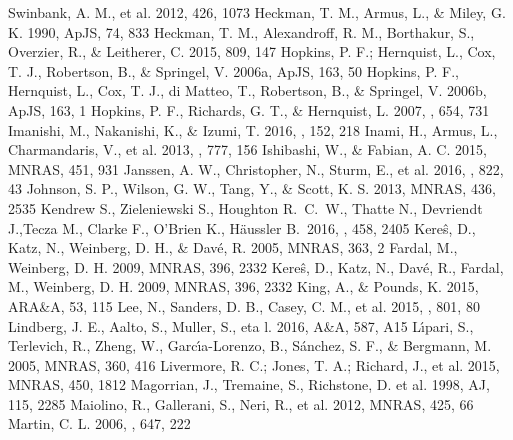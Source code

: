 \documentclass{pasa}%
\begin{document}
\begin{thebibliography}{}
    Swinbank, A. M., et al. 2012, 426, 1073
   Heckman, T. M., Armus, L., \& Miley,
    G. K. 1990, ApJS, 74, 833
   Heckman, T. M., Alexandroff, R. M.,
    Borthakur, S., Overzier, R., \& Leitherer, C. 2015, 809, 147
   Hopkins, P. F.; Hernquist, L., Cox,
    T. J., Robertson, B., \& Springel, V. 2006a, ApJS, 163, 50
   Hopkins, P. F., Hernquist, L., Cox,
    T. J., di Matteo, T., Robertson, B., \& Springel, V. 2006b, ApJS, 163, 1
   Hopkins, P. F., Richards, G. T.,
    \& Hernquist, L. 2007, \apj, 654, 731
   Imanishi, M., Nakanishi, K., \&
    Izumi, T. 2016, \aj, 152, 218
   Inami, H., Armus, L., Charmandaris, V.,
    et al. 2013, \apj, 777, 156
   Ishibashi, W., \& Fabian,
    A. C. 2015, MNRAS, 451, 931
   Janssen, A. W., Christopher, N.,
    Sturm, E., et al. 2016, \apj, 822, 43
   Johnson, S. P., Wilson, G. W., Tang,
    Y., \& Scott, K. S. 2013, MNRAS, 436, 2535
   Kendrew S., Zieleniewski S., Houghton
    R.~C.~W., Thatte N., Devriendt J.,Tecza M., Clarke F., O'Brien K.,
    H{\"a}ussler B.\ 2016, \mnras, 458, 2405
   Kere\^s, D., Katz, N., Weinberg,
    D. H., \& Dav\'e, R. 2005, MNRAS, 363, 2
    Fardal, M., Weinberg, D. H. 2009, MNRAS, 396, 2332
   Kere\^s, D., Katz, N., Dav\'e, R.,
    Fardal, M., Weinberg, D. H. 2009, MNRAS, 396, 2332
   King, A., \& Pounds, K. 2015, ARA\&A,
    53, 115
   Lee, N., Sanders, D. B., Casey, C. M., et
    al. 2015, \apj, 801, 80
   Lindberg, J. E., Aalto, S., Muller,
    S., eta l. 2016, A\&A, 587, A15
   L\'{\i}pari, S., Terlevich, R.,
    Zheng, W., Garc\'{\i}a-Lorenzo, B., S\'anchez, S. F., \& Bergmann,
    M. 2005, MNRAS, 360, 416
   Livermore, R. C.; Jones, T. A.;
    Richard, J., et al. 2015, MNRAS, 450, 1812
   Magorrian, J., Tremaine, S.,
    Richstone, D. et al. 1998, AJ, 115, 2285
   Maiolino, R., Gallerani, S., Neri,
    R., et al. 2012, MNRAS, 425, 66
   Martin, C. L. 2006, \apj, 647, 222

\end{thebibliography}
\end{document}
